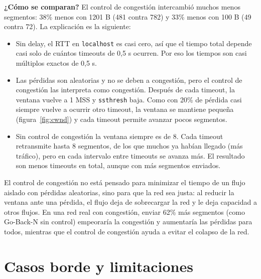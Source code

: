 \documentclass[11pt,letterpaper]{article}
\begin{document}
\textbf{¿Cómo se comparan?} El control de congestión intercambió muchos menos segmentos:
38\% menos con 1201 B (481 contra 782) y 33\% menos con 100 B (49 contra 72). La
explicación es la siguiente:

\begin{itemize}[nosep]
  \item Sin delay, el RTT en \texttt{localhost} es casi cero, así que el tiempo total
        depende casi solo de cuántos timeouts de 0,5 s ocurren. Por eso los tiempos son
        casi múltiplos exactos de 0,5 s.
  \item Las pérdidas son aleatorias y no se deben a congestión, pero el control de
        congestión las interpreta como congestión. Después de cada timeout, la ventana
        vuelve a 1 MSS y \texttt{ssthresh} baja. Como con 20\% de pérdida casi siempre
        vuelve a ocurrir otro timeout, la ventana se mantiene pequeña (figura~\ref{fig:cwnd})
        y cada timeout permite avanzar pocos segmentos.
  \item Sin control de congestión la ventana siempre es de 8. Cada timeout retransmite
        hasta 8 segmentos, de los que muchos ya habían llegado (más tráfico), pero en cada
        intervalo entre timeouts se avanza más. El resultado son menos timeouts en total,
        aunque con más segmentos enviados.
\end{itemize}

El control de congestión no está pensado para minimizar el tiempo de un flujo aislado con
pérdidas aleatorias, sino para que la red sea justa: al reducir la ventana ante una
pérdida, el flujo deja de sobrecargar la red y le deja capacidad a otros flujos. En una
red real con congestión, enviar 62\% más segmentos (como Go-Back-N sin control) empeoraría
la congestión y aumentaría las pérdidas para todos, mientras que el control de congestión
ayuda a evitar el colapso de la red.

\section{Casos borde y limitaciones}
\end{document}

